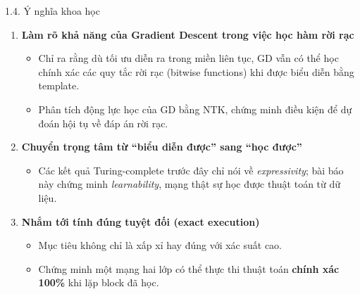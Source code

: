 \documentclass[10pt, aspectratio=169]{beamer}
\begin{document}
\begin{frame}{1.4. Ý nghĩa khoa học}

\begin{enumerate}

    \item \textbf{Làm rõ khả năng của Gradient Descent trong việc học hàm rời rạc}
    \begin{itemize}
        \item Chỉ ra rằng dù tối ưu diễn ra trong miền liên tục, GD vẫn có thể học chính xác các quy tắc rời rạc (bitwise functions) khi được biểu diễn bằng template.
        \item Phân tích động lực học của GD bằng NTK, chứng minh điều kiện để dự đoán hội tụ về đáp án rời rạc.
    \end{itemize}

    \item \textbf{Chuyển trọng tâm từ “biểu diễn được” sang “học được”}
    \begin{itemize}
        \item Các kết quả Turing-complete trước đây chỉ nói về \textit{expressivity};
        bài báo này chứng minh \textit{learnability}, mạng thật sự học được thuật toán từ dữ liệu.
    \end{itemize}

    \item \textbf{Nhắm tới tính đúng tuyệt đối (exact execution)}
    \begin{itemize}
        \item Mục tiêu không chỉ là xấp xỉ hay đúng với xác suất cao.
        \item Chứng minh một mạng hai lớp có thể thực thi thuật toán \textbf{chính xác 100\%} khi lặp block đã học.
    \end{itemize}

\end{enumerate}

\end{frame}
\end{document}
